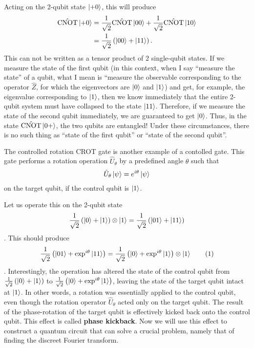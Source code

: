 \documentclass[12pt,oneside]{book}
\newcommand\numberthis{\addtocounter{equation}{1}\tag{\theequation}}
\begin{document}
Acting on the 2-qubit state $\ket{+0}$, this will produce
\begin{align*}
    \hat{\mathrm{CNOT}} \ket{+0} &{}= \frac{1}{\sqrt{2}} \hat{\mathrm{CNOT}} \ket{00} + \frac{1}{\sqrt{2}} \hat{\mathrm{CNOT}} \ket{10}\\
    &{}= \frac{1}{\sqrt{2}} \left(\ket{00}+\ket{11}\right).
\end{align*}
This can not be written as a tensor product of 2 single-qubit states. If we measure the state of the first qubit (in this context, when I say ``measure the state'' of a qubit, what I mean is ``measure the observable corresponding to the operator $\hat{Z}$, for which the eigenvectors are $\ket{0}$ and $\ket{1}$) and get, for example, the eigenvalue corresponding to $\ket{1}$, then we know immediately that the entire 2-qubit system must have collapsed to the state $\ket{11}$. Therefore, if we measure the state of the second qubit immediately, we are guaranteed to get $\ket{0}$. Thus, in the state $\hat{\mathrm{CNOT}}\ket{0+}$, the two qubits are entangled! Under these circumstances, there is no such thing as ``state of the first qubit'' or ``state of the second qubit''.

The controlled rotation CROT gate is another example of a contolled gate. This gate performs a rotation operation $\hat{U}_\theta$ by a predefined angle $\theta$ such that
\begin{align}\label{kickback1}   \hat{U}_\theta\ket{\psi}=e^{i\theta}\ket{\psi}
\end{align}
on the target qubit, if the control qubit is $\ket{1}$.

Let us operate this on the 2-qubit state $$\frac{1}{\sqrt{2}}\left(\ket{0}+\ket{1}\right)\otimes\ket{1} = \frac{1}{\sqrt{2}}\left(\ket{01}+\ket{11}\right)$$. This should produce
\begin{align*}\label{kickback2}
    \frac{1}{\sqrt{2}}\left(\ket{01}+\exp^{i\theta}\ket{11}\right) = \frac{1}{\sqrt{2}} \left(\ket{0}+\exp^{i\theta}\ket{1}\right)\otimes\ket{1}\numberthis
\end{align*}.
Interestingly, the operation has altered the state of the control qubit from $\frac{1}{\sqrt{2}}\left(\ket{0}+\ket{1}\right)$ to $\frac{1}{\sqrt{2}}\left(\ket{0}+\exp^{i\theta}\ket{1}\right)$, leaving the state of the target qubit intact at $\ket{1}$. In other words, a rotation was essentially applied to the control qubit, even though the rotation operator $\hat{U}_\theta$ acted only on the target qubit. The result of the phase-rotation of the target qubit is effectively kicked back onto the control qubit. This effect is called \textbf{phase kickback}.
Now we will use this effect to construct a quantum circuit that can solve a crucial problem, namely that of finding the discreet Fourier transform.
\end{document}
